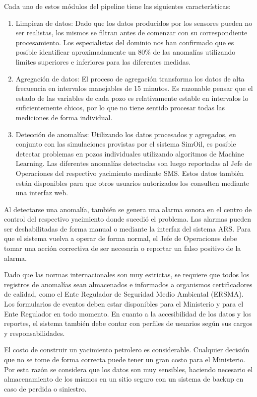 \documentclass{article}
\theoremstyle{definition}
\theoremstyle{remark}
\begin{document}
Cada uno de estos módulos del pipeline tiene las siguientes características:
\begin{enumerate}
	\item Limpieza de datos: Dado que los datos producidos por los sensores pueden no ser realistas, los mismos se filtran antes de comenzar con su correspondiente procesamiento. Los especialistas del dominio nos han confirmado que es posible identificar aproximadamente un 80\% de las anomalías utilizando limites superiores e inferiores para las diferentes medidas.
	\item Agregación de datos: El proceso de agregación transforma los datos de alta frecuencia en intervalos manejables de 15 minutos. Es razonable pensar que el estado de las variables de cada pozo es relativamente estable en intervalos lo suficientemente chicos, por lo que no tiene sentido procesar todas las mediciones de forma individual.
	\item Detección de anomalías: Utilizando los datos procesados y agregados, en conjunto con las simulaciones provistas por el sistema SimOil, es posible detectar problemas en pozos individuales utilizando algoritmos de Machine Learning. Las diferentes anomalías detectadas son luego reportadas al Jefe de Operaciones del respectivo yacimiento mediante SMS. Estos datos también están disponibles para que otros usuarios autorizados los consulten mediante una interfaz web.
\end{enumerate}

Al detectarse una anomalía, también se genera una alarma sonora en el centro de control del respectivo yacimiento donde sucedió el problema. Las alarmas pueden ser deshabilitadas de forma manual o mediante la interfaz del sistema ARS. Para que el sistema vuelva a operar de forma normal, el Jefe de Operaciones debe tomar una acción correctiva de ser necesaria o reportar un falso positivo de la alarma.

Dado que las normas internacionales son muy estrictas, se requiere que todos los registros de anomalías sean almacenados e informados a organismos certificadores de calidad, como el Ente Regulador de Seguridad Medio Ambiental (ERSMA). Los formularios de eventos deben estar disponibles para el Ministerio y para el Ente Regulador en todo momento. En cuanto a la accesibilidad de los datos y los reportes, el sistema también debe contar con perfiles de usuarios según sus cargos y responsabilidades.

El costo de construir un yacimiento petrolero es considerable. Cualquier decisión que no se tome de forma correcta puede tener un gran costo para el Ministerio. Por esta razón se considera que los datos son muy sensibles, haciendo necesario el almacenamiento de los mismos en un sitio seguro con un sistema de backup en caso de perdida o siniestro.
\end{document}
